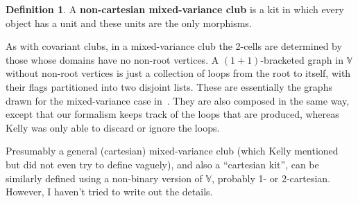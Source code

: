 \documentclass{article}
\theoremstyle{definition}
\newtheorem{defn}[thm]{Definition}
\theoremstyle{remark}
\def\vhy{\mathbb{V}}
\begin{document}
\begin{defn}
  A \textbf{non-cartesian mixed-variance club} is a kit in which every object has a unit and these units are the only morphisms.
\end{defn}

As with covariant clubs, in a mixed-variance club the 2-cells are determined by those whose domains have no non-root vertices.
A $(1+1)$-bracketed graph in $\vhy$ without non-root vertices is just a collection of loops from the root to itself, with their flags partitioned into two disjoint lists.
These are essentially the graphs drawn for the mixed-variance case in~\cite{kelly:mv-funct-calc,kelly:abst-coh}.
They are also composed in the same way, except that our formalism keeps track of the loops that are produced, whereas Kelly was only able to discard or ignore the loops.

Presumably a general (cartesian) mixed-variance club (which Kelly mentioned but did not even try to define vaguely), and also a ``cartesian kit'', can be similarly defined using a non-binary version of $\vhy$, probably 1- or 2-cartesian.
However, I haven't tried to write out the details.




\end{document}
